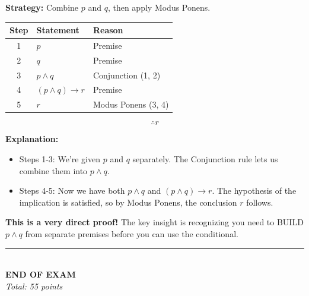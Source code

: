 \documentclass[11pt,a4paper]{article}
\begin{document}
\begin{solnbox}
\textbf{Strategy:} Combine $p$ and $q$, then apply Modus Ponens.

\begin{center}
\begin{tabular}{c|l|l}
\toprule
\textbf{Step} & \textbf{Statement} & \textbf{Reason} \\
\midrule
1 & $p$ & Premise \\
2 & $q$ & Premise \\
3 & $p \land q$ & Conjunction (1, 2) \\
4 & $(p \land q) \to r$ & Premise \\
5 & $r$ & Modus Ponens (3, 4) \\
\bottomrule
\end{tabular}
\end{center}

$$\boxed{\therefore r}$$

\textbf{Explanation:}
\begin{itemize}[noitemsep]
    \item Steps 1-3: We're given $p$ and $q$ separately. The Conjunction rule lets us combine them into $p \land q$.
    \item Steps 4-5: Now we have both $p \land q$ and $(p \land q) \to r$. The hypothesis of the implication is satisfied, so by Modus Ponens, the conclusion $r$ follows.
\end{itemize}

\textbf{This is a very direct proof!} The key insight is recognizing you need to BUILD $p \land q$ from separate premises before you can use the conditional.
\end{solnbox}

\vspace{20pt}

\begin{center}
\rule{0.5\textwidth}{0.5pt}\\[5pt]
\textbf{END OF EXAM}\\[3pt]
\textit{Total: 55 points}
\end{center}
\end{document}
